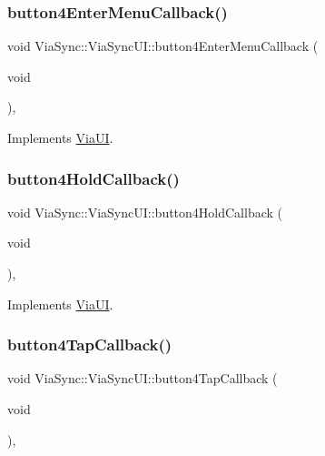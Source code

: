 \subsubsection{\texorpdfstring{button4\+Enter\+Menu\+Callback()}{button4EnterMenuCallback()}}
{\footnotesize\ttfamily void Via\+Sync\+::\+Via\+Sync\+U\+I\+::button4\+Enter\+Menu\+Callback (\begin{DoxyParamCaption}\item[{void}]{ }\end{DoxyParamCaption})\hspace{0.3cm}{\ttfamily [override]}, {\ttfamily [virtual]}}



Implements \mbox{\hyperlink{class_via_u_i_a6db24e53e559b6fddd4cb1f918de40d6}{Via\+UI}}.

\mbox{\label{class_via_sync_1_1_via_sync_u_i_a7b84320153b6b7e4ae5499f4092a85d5}} 
\subsubsection{\texorpdfstring{button4\+Hold\+Callback()}{button4HoldCallback()}}
{\footnotesize\ttfamily void Via\+Sync\+::\+Via\+Sync\+U\+I\+::button4\+Hold\+Callback (\begin{DoxyParamCaption}\item[{void}]{ }\end{DoxyParamCaption})\hspace{0.3cm}{\ttfamily [override]}, {\ttfamily [virtual]}}



Implements \mbox{\hyperlink{class_via_u_i_a11919091b39319fe4d1b3a3f3c7104c5}{Via\+UI}}.

\mbox{\label{class_via_sync_1_1_via_sync_u_i_a00ba5badfeedc792a05f3e3c0ac19d73}} 
\subsubsection{\texorpdfstring{button4\+Tap\+Callback()}{button4TapCallback()}}
{\footnotesize\ttfamily void Via\+Sync\+::\+Via\+Sync\+U\+I\+::button4\+Tap\+Callback (\begin{DoxyParamCaption}\item[{void}]{ }\end{DoxyParamCaption})\hspace{0.3cm}{\ttfamily [override]}, {\ttfamily [virtual]}}



